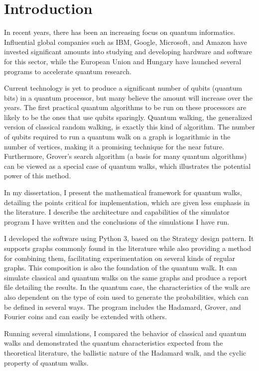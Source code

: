 \chapter{Introduction}

In recent years, there has been an increasing focus on quantum informatics. Influential global companies such as IBM, Google, Microsoft, and Amazon have invested significant amounts into studying and developing hardware and software for this sector, while the European Union and Hungary have launched several programs to accelerate quantum research.

Current technology is yet to produce a significant number of qubits (quantum bits) in a quantum processor, but many believe the amount will increase over the years. The first practical quantum algorithms to be run on these processors are likely to be the ones that use qubits sparingly. Quantum walking, the generalized version of classical random walking, is exactly this kind of algorithm. The number of qubits required to run a quantum walk on a graph is logarithmic in the number of vertices, making it a promising technique for the near future. Furthermore, Grover's search algorithm (a basis for many quantum algorithms) can be viewed as a special case of quantum walks, which illustrates the potential power of this method.

In my dissertation, I present the mathematical framework for quantum walks, detailing the points critical for implementation, which are given less emphasis in the literature. I describe the architecture and capabilities of the simulator program I have written and the conclusions of the simulations I have run.

I developed the software using Python 3, based on the Strategy design pattern. It supports graphs commonly found in the literature while also providing a method for combining them, facilitating experimentation on several kinds of regular graphs. This composition is also the foundation of the quantum walk. It can simulate classical and quantum walks on the same graphs and produce a report file detailing the results. In the quantum case, the characteristics of the walk are also dependent on the type of coin used to generate the probabilities, which can be defined in several ways. The program includes the Hadamard, Grover, and Fourier coins and can easily be extended with others.

Running several simulations, I compared the behavior of classical and quantum walks and demonstrated the quantum characteristics expected from the theoretical literature, the ballistic nature of the Hadamard walk, and the cyclic property of quantum walks.

